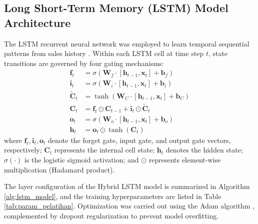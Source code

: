 \documentclass[10pt,a4paper]{article}
\begin{document}
\subsection{Long Short-Term Memory (LSTM) Model Architecture}
The LSTM recurrent neural network was employed to learn temporal sequential patterns from sales history \cite{hochreiter1997}. Within each LSTM cell at time step $t$, state transitions are governed by four gating mechanisms:
\begin{align}
  \mathbf{f}_t &= \sigma\left(\mathbf{W}_f \cdot [\mathbf{h}_{t-1}, \mathbf{x}_t] + \mathbf{b}_f\right) \label{eq:forget_gate} \\
  \mathbf{i}_t &= \sigma\left(\mathbf{W}_i \cdot [\mathbf{h}_{t-1}, \mathbf{x}_t] + \mathbf{b}_i\right) \label{eq:input_gate} \\
  \tilde{\mathbf{C}}_t &= \tanh\left(\mathbf{W}_C \cdot [\mathbf{h}_{t-1}, \mathbf{x}_t] + \mathbf{b}_C\right) \label{eq:candidate_cell} \\
  \mathbf{C}_t &= \mathbf{f}_t \odot \mathbf{C}_{t-1} + \mathbf{i}_t \odot \tilde{\mathbf{C}}_t \label{eq:cell_update} \\
  \mathbf{o}_t &= \sigma\left(\mathbf{W}_o \cdot [\mathbf{h}_{t-1}, \mathbf{x}_t] + \mathbf{b}_o\right) \label{eq:output_gate} \\
  \mathbf{h}_t &= \mathbf{o}_t \odot \tanh(\mathbf{C}_t) \label{eq:hidden_state}
\end{align}
where $\mathbf{f}_t, \mathbf{i}_t, \mathbf{o}_t$ denote the forget gate, input gate, and output gate vectors, respectively; $\mathbf{C}_t$ represents the internal cell state; $\mathbf{h}_t$ denotes the hidden state; $\sigma(\cdot)$ is the logistic sigmoid activation; and $\odot$ represents element-wise multiplication (Hadamard product).

The layer configuration of the Hybrid LSTM model is summarized in Algorithm \ref{alg:lstm_model}, and the training hyperparameters are listed in Table \ref{tab:param_pelatihan}. Optimization was carried out using the Adam algorithm \cite{kingma2015adam}, complemented by dropout regularization \cite{srivastava2014dropout} to prevent model overfitting.
\end{document}
